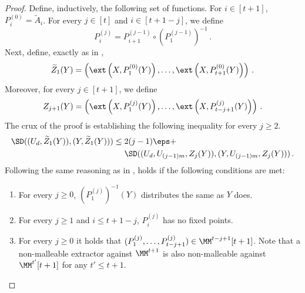\begin{proof}
Define, inductively, the following set of functions. 
For $i \in [t+1]$, $P_i^{(0)} = \widetilde{A}_i$. For every
$j \in [t]$ and $i \in [t+1-j]$, we define
\begin{equation}\label{eq:composing perm}
P_i^{(j)} = P_{i+1}^{(j-1)} \circ \left( P_{1}^{(j-1)} \right)^{-1}\,.
\end{equation}
Next, define, exactly as in ,
\[
\widetilde{Z}_1(Y) = \left( \ext\left(X,P_{1}^{(0)}(Y)\right),\ldots, \ext\left(X,P_{t+1}^{(0)}(Y)\right) \right)\,.
\]
Moreover, for every $j \in [t+1]$, we define
\[
Z_{j+1}(Y) = \left( \ext\left(X,P_{1}^{(j)}(Y)\right),\ldots, \ext\left(X,P_{t-j+1}^{(j)}(Y)\right)\right)\,.
\]
The crux of the proof is establishing the following inequality for every $j \ge 2$.
\begin{align}\label{eq:pm}
\SD((U_d,\widetilde{Z}_1(Y)),(Y,\widetilde{Z}_1(Y))) &\le 2(j-1)\eps + \nonumber \\
& ~~~~\SD((U_{d},U_{(j-1)m},Z_j(Y)),(Y,U_{(j-1)m},Z_{j}(Y)))\,.
\end{align}
Following the same reasoning as in ,  holds if the 
following conditions are met:
\begin{enumerate}
\item\label{it:pm1}	For every $j \ge 0$, $\left(P_{1}^{(j)}\right)^{-1}(Y)$ distributes the same as $Y$ does.
\item\label{it:pm2}	For every $j \ge 1$ and $i \le t+1-j$, $P_{i}^{(j)}$ has no fixed points.
\item\label{it:pm3}	For every $j \ge 0$ it holds that $( P_{1}^{(j)},\ldots,P_{t-j+1}^{(j)} ) \in \MM^{t-j+1}[t+1]$.
Note that a non-malleable extractor against $\MM^{t+1}$
is also non-malleable against $\MM^{t'}[t+1]$ for any $t' \le t+1$. 
\end{enumerate}


\end{proof}
